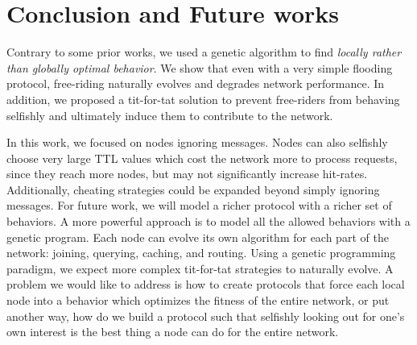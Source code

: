 \documentclass[12pt,journal,draftcls,letterpaper,onecolumn]{IEEEtran}
\begin{document}
\section{Conclusion and Future works}\label{sec:concl}

Contrary to some prior works, we used a genetic algorithm to find
\emph{locally rather than globally optimal behavior}.
We show that even with a very simple flooding protocol, free-riding naturally
evolves and degrades network performance.
In addition, we proposed a tit-for-tat solution to prevent free-riders
from behaving selfishly and
ultimately induce them to contribute to the network.

In this work, we focused on nodes ignoring messages.  Nodes can also
selfishly choose very large TTL values which cost the network more to process
requests, since they reach more nodes, but may not significantly increase
hit-rates.  Additionally, cheating strategies could be expanded beyond simply
ignoring messages.
For future work, we will model a richer protocol with a richer set of
behaviors.  A more powerful approach is to model all the allowed behaviors
with a genetic program.  Each node can evolve its own algorithm for each part
of the network: joining, querying, caching, and routing.
Using a genetic programming paradigm, we expect more complex tit-for-tat
strategies to naturally evolve.
A problem we would like to address is how to create protocols that force each
local node into a behavior which optimizes the fitness of the entire network,
or put another way, how do we build a protocol such that selfishly looking out
for one's own interest is the best thing a node can do for the entire network.



\end{document}
